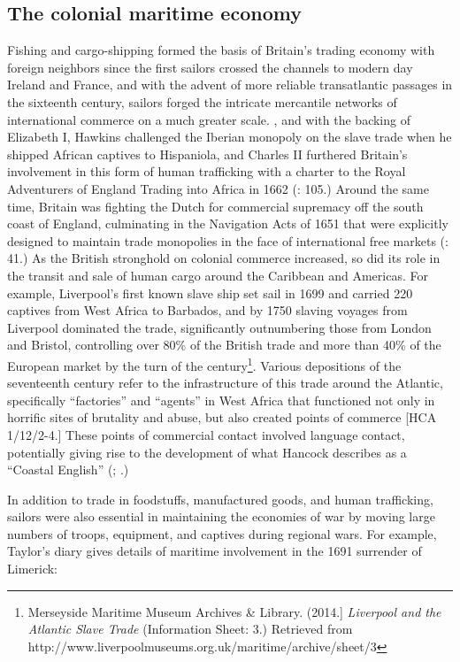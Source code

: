 \subsection{{The} {colonial} {maritime} {economy}}%

  Fishing and cargo-shipping formed the basis of Britain’s trading economy with foreign neighbors since the first sailors crossed the channels to modern day Ireland and France, and with the advent of more reliable transatlantic passages in the sixteenth century, sailors forged the intricate mercantile networks of international commerce on a much greater scale. \citealt{In1562}, and with the backing of Elizabeth I, Hawkins challenged the Iberian monopoly on the slave trade when he shipped African captives to Hispaniola, and Charles II furthered Britain’s involvement in this form of human trafficking with a charter to the Royal Adventurers of England Trading into Africa in 1662 (\citealt{Brown2011}: 105.) Around the same time, Britain was fighting the Dutch for commercial supremacy off the south coast of England, culminating in the Navigation Acts of 1651 that were explicitly designed to maintain trade monopolies in the face of international free markets (\citealt{Brown2011}: 41.) As the British stronghold on colonial commerce increased, so did its role in the transit and sale of human cargo around the Caribbean and Americas. For example, Liverpool’s first known slave ship set sail in 1699 and carried 220 captives from West Africa to Barbados, and by 1750 slaving voyages from Liverpool dominated the trade, significantly outnumbering those from London and Bristol, controlling over 80\% of the British trade and more than 40\% of the European market by the turn of the century\footnote{Merseyside Maritime Museum Archives \& Library. (2014.] \textit{Liverpool and the Atlantic Slave Trade} (Information Sheet: 3.) Retrieved from http://www.liverpoolmuseums.org.uk/maritime/archive/sheet/3}. Various depositions of the seventeenth century refer to the infrastructure of this trade around the Atlantic, specifically “factories” and “agents” in West Africa that functioned not only in horrific sites of brutality and abuse, but also created points of commerce [HCA 1/12/2-4.] These points of commercial contact involved language contact, potentially giving rise to the development of what Hancock describes as a “Coastal English” (\citealt{Hancock1986}; \citealt{DelgadoHancock2017}.)

In addition to trade in foodstuffs, manufactured goods, and human trafficking, sailors were also essential in maintaining the economies of war by moving large numbers of troops, equipment, and captives during regional wars. For example, Taylor’s diary gives details of maritime involvement in the 1691 surrender of Limerick:

